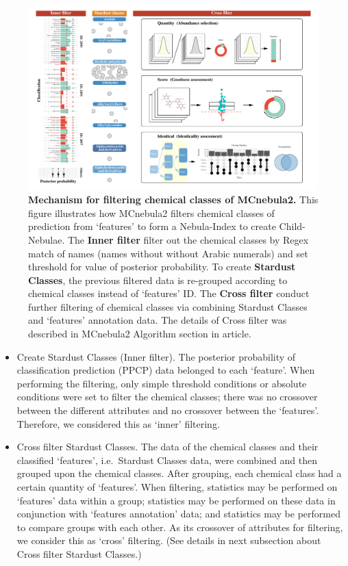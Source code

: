 \documentclass[
]{article}
\begin{document}
\begin{figure}
\hypertarget{fig:mech}{%
\centering
\includegraphics{fig1.mech.pdf}
\caption{\textbf{Mechanism for filtering chemical classes of MCnebula2.}
This figure illustrates how MCnebula2 filters chemical classes of
prediction from `features' to form a Nebula-Index to create
Child-Nebulae. The \textbf{Inner filter} filter out the chemical classes
by Regex match of names (names without without Arabic numerals) and set
threshold for value of posterior probability. To create \textbf{Stardust
Classes}, the previous filtered data is re-grouped according to chemical
classes instead of `features' ID. The \textbf{Cross filter} conduct
further filtering of chemical classes via combining Stardust Classes and
`features' annotation data. The details of Cross filter was described in
MCnebula2 Algorithm section in article.}\label{fig:mech}
}
\end{figure}

\begin{itemize}
\item
  Create Stardust Classes (Inner filter). The posterior probability of
  classification prediction (PPCP) data belonged to each `feature'. When
  performing the filtering, only simple threshold conditions or absolute
  conditions were set to filter the chemical classes; there was no
  crossover between the different attributes and no crossover between
  the `features'. Therefore, we considered this as `inner' filtering.
\item
  Cross filter Stardust Classes. The data of the chemical classes and
  their classified `features', i.e.~Stardust Classes data, were combined
  and then grouped upon the chemical classes. After grouping, each
  chemical class had a certain quantity of `features'. When filtering,
  statistics may be performed on `features' data within a group;
  statistics may be performed on these data in conjunction with
  `features annotation' data; and statistics may be performed to compare
  groups with each other. As its crossover of attributes for filtering,
  we consider this as `cross' filtering. (See details in next subsection
  about Cross filter Stardust Classes.)
\end{itemize}
\end{document}

